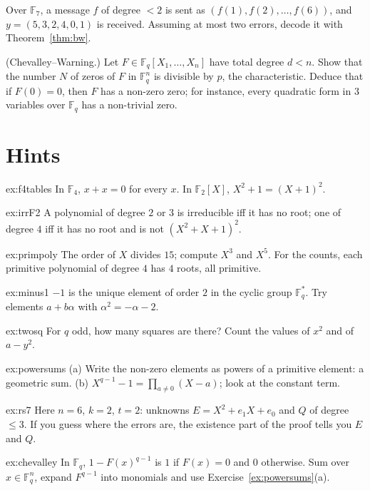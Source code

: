 \begin{exercise}[$\star\star$]\label{ex:rs7}
Over $\mathbb F_7$, a message $f$ of degree $<2$ is sent as $(f(1),f(2),\dots,f(6))$, and $y=(5,3,2,4,0,1)$ is received. Assuming at most two errors, decode it with Theorem~\ref{thm:bw}.
\end{exercise}

\begin{exercise}[$\star\star\star$]\label{ex:chevalley}
(Chevalley--Warning.) Let $F\in\mathbb F_q[X_1,\dots,X_n]$ have total degree $d<n$. Show that the number $N$ of zeros of $F$ in $\mathbb F_q^n$ is divisible by $p$, the characteristic. Deduce that if $F(0)=0$, then $F$ has a non-zero zero; for instance, every quadratic form in $3$ variables over $\mathbb F_q$ has a non-trivial zero.
\end{exercise}

\section{Hints}

\begin{hint}{ex:f4tables}
In $\mathbb F_4$, $x+x=0$ for every $x$. In $\mathbb F_2[X]$, $X^2+1=(X+1)^2$.
\end{hint}
\begin{hint}{ex:irrF2}
A polynomial of degree $2$ or $3$ is irreducible iff it has no root; one of degree $4$ iff it has no root and is not $(X^2+X+1)^2$.
\end{hint}
\begin{hint}{ex:primpoly}
The order of $X$ divides $15$; compute $X^3$ and $X^5$. For the counts, each primitive polynomial of degree $4$ has $4$ roots, all primitive.
\end{hint}
\begin{hint}{ex:minus1}
$-1$ is the unique element of order $2$ in the cyclic group $\mathbb F_q^*$. Try elements $a+b\alpha$ with $\alpha^2=-\alpha-2$.
\end{hint}
\begin{hint}{ex:twosq}
For $q$ odd, how many squares are there? Count the values of $x^2$ and of $a-y^2$.
\end{hint}
\begin{hint}{ex:powersums}
(a) Write the non-zero elements as powers of a primitive element: a geometric sum. (b) $X^{q-1}-1=\prod_{a\ne0}(X-a)$; look at the constant term.
\end{hint}
\begin{hint}{ex:rs7}
Here $n=6$, $k=2$, $t=2$: unknowns $E=X^2+e_1X+e_0$ and $Q$ of degree $\le3$. If you guess where the errors are, the existence part of the proof tells you $E$ and $Q$.
\end{hint}
\begin{hint}{ex:chevalley}
In $\mathbb F_q$, $1-F(x)^{q-1}$ is $1$ if $F(x)=0$ and $0$ otherwise. Sum over $x\in\mathbb F_q^n$, expand $F^{q-1}$ into monomials and use Exercise~\ref{ex:powersums}(a).
\end{hint}

